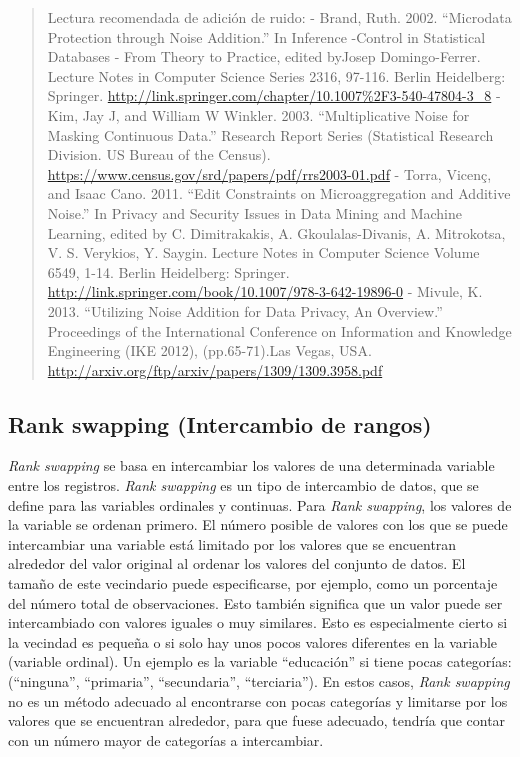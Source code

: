 \documentclass[]{book}
\theoremstyle{definition}
\theoremstyle{definition}
\theoremstyle{definition}
\theoremstyle{definition}
\theoremstyle{remark}
\begin{document}
\begin{quote}
Lectura recomendada de adición de ruido:
- Brand, Ruth. 2002. ``Microdata Protection through Noise Addition.'' In Inference -Control in Statistical Databases - From Theory to Practice, edited byJosep Domingo-Ferrer. Lecture Notes in Computer Science Series 2316, 97-116. Berlin Heidelberg: Springer. \url{http://link.springer.com/chapter/10.1007\%2F3-540-47804-3_8}
- Kim, Jay J, and William W Winkler. 2003. ``Multiplicative Noise for Masking Continuous Data.'' Research Report Series (Statistical Research Division. US Bureau of the Census). \url{https://www.census.gov/srd/papers/pdf/rrs2003-01.pdf}
- Torra, Vicenç, and Isaac Cano. 2011. ``Edit Constraints on Microaggregation and Additive Noise.'' In Privacy and Security Issues in Data Mining and Machine Learning, edited by C. Dimitrakakis, A. Gkoulalas-Divanis, A. Mitrokotsa, V. S. Verykios, Y. Saygin. Lecture Notes in Computer Science Volume 6549, 1-14. Berlin Heidelberg: Springer. \url{http://link.springer.com/book/10.1007/978-3-642-19896-0}
- Mivule, K. 2013. ``Utilizing Noise Addition for Data Privacy, An Overview.'' Proceedings of the International Conference on Information and Knowledge Engineering (IKE 2012), (pp.65-71).Las Vegas, USA. \url{http://arxiv.org/ftp/arxiv/papers/1309/1309.3958.pdf}
\end{quote}

\hypertarget{rank-swapping-intercambio-de-rangos}{%
\subsection{Rank swapping (Intercambio de rangos)}\label{rank-swapping-intercambio-de-rangos}}

\emph{Rank swapping} se basa en intercambiar los valores de una determinada variable entre los registros. \emph{Rank swapping} es un tipo de intercambio de datos, que se define para las variables ordinales y continuas. Para \emph{Rank swapping}, los valores de la variable se ordenan primero. El número posible de valores con los que se puede intercambiar una variable está limitado por los valores que se encuentran alrededor del valor original al ordenar los valores del conjunto de datos. El tamaño de este vecindario puede especificarse, por ejemplo, como un porcentaje del número total de observaciones. Esto también significa que un valor puede ser intercambiado con valores iguales o muy similares. Esto es especialmente cierto si la vecindad es pequeña o si solo hay unos pocos valores diferentes en la variable (variable ordinal). Un ejemplo es la variable ``educación'' si tiene pocas categorías: (``ninguna'', ``primaria'', ``secundaria'', ``terciaria''). En estos casos, \emph{Rank swapping} no es un método adecuado al encontrarse con pocas categorías y limitarse por los valores que se encuentran alrededor, para que fuese adecuado, tendría que contar con un número mayor de categorías a intercambiar.
\end{document}

